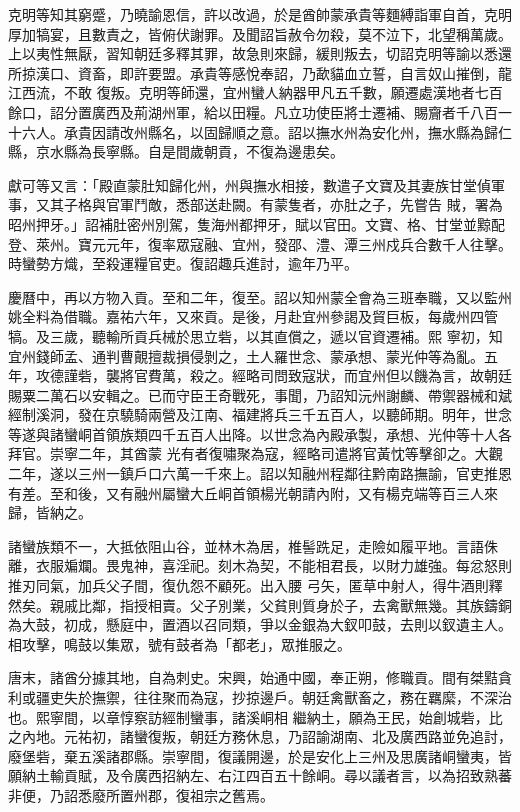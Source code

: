 \begin{pinyinscope}
 克明等知其窮蹙，乃曉諭恩信，許以改過，於是酋帥蒙承貴等麵縛詣軍自首，克明厚加犒宴，且數責之，皆俯伏謝罪。及聞詔旨赦令勿殺，莫不泣下，北望稱萬歲。上以夷性無厭，習知朝廷多釋其罪，故急則來歸，緩則叛去，切詔克明等諭以悉還所掠漢口、資畜，即許要盟。承貴等感悅奉詔，乃歃貓血立誓，自言奴山摧倒，龍江西流，不敢
 復叛。克明等師還，宜州蠻人納器甲凡五千數，願遷處漢地者七百餘口，詔分置廣西及荊湖州軍，給以田糧。凡立功使臣將士遷補、賜齎者千八百一十六人。承貴因請改州縣名，以固歸順之意。詔以撫水州為安化州，撫水縣為歸仁縣，京水縣為長寧縣。自是間歲朝貢，不復為邊患矣。



 獻可等又言：「殿直蒙肚知歸化州，州與撫水相接，數遣子文寶及其妻族甘堂偵軍事，又其子格與官軍鬥敵，悉部送赴闕。有蒙隻者，亦肚之子，先嘗告
 賊，署為昭州押牙。」詔補肚密州別駕，隻海州都押牙，賦以官田。文寶、格、甘堂並黥配登、萊州。寶元元年，復率眾寇融、宜州，發邵、澧、潭三州戍兵合數千人往擊。時蠻勢方熾，至殺運糧官吏。復詔趣兵進討，逾年乃平。



 慶曆中，再以方物入貢。至和二年，復至。詔以知州蒙全會為三班奉職，又以監州姚全料為借職。嘉祐六年，又來貢。是後，月赴宜州參謁及貿巨板，每歲州四管犒。及三歲，聽輸所貢兵械於思立砦，以其直償之，遞以官資遷補。熙
 寧初，知宜州錢師孟、通判曹覿擅裁損侵剝之，土人羅世念、蒙承想、蒙光仲等為亂。五年，攻德謹砦，襲將官費萬，殺之。經略司問致寇狀，而宜州但以饑為言，故朝廷賜粟二萬石以安輯之。已而守臣王奇戰死，事聞，乃詔知沅州謝麟、帶禦器械和斌經制溪洞，發在京驍騎兩營及江南、福建將兵三千五百人，以聽師期。明年，世念等遂與諸蠻峒首領族類四千五百人出降。以世念為內殿承製，承想、光仲等十人各拜官。崇寧二年，其酋蒙
 光有者復嘯聚為寇，經略司遣將官黃忱等擊卻之。大觀二年，遂以三州一鎮戶口六萬一千來上。詔以知融州程鄰往黔南路撫諭，官吏推恩有差。至和後，又有融州屬蠻大丘峒首領楊光朝請內附，又有楊克端等百三人來歸，皆納之。



 諸蠻族類不一，大抵依阻山谷，並林木為居，椎髻跣足，走險如履平地。言語侏離，衣服斒斕。畏鬼神，喜淫祀。刻木為契，不能相君長，以財力雄強。每忿怒則推刃同氣，加兵父子間，復仇怨不顧死。出入腰
 弓矢，匿草中射人，得牛酒則釋然矣。親戚比鄰，指授相賣。父子別業，父貧則質身於子，去禽獸無幾。其族鑄銅為大鼓，初成，懸庭中，置酒以召同類，爭以金銀為大釵叩鼓，去則以釵遺主人。相攻擊，鳴鼓以集眾，號有鼓者為「都老」，眾推服之。



 唐末，諸酋分據其地，自為刺史。宋興，始通中國，奉正朔，修職貢。間有桀黠貪利或疆吏失於撫禦，往往聚而為寇，抄掠邊戶。朝廷禽獸畜之，務在羈縻，不深治也。熙寧間，以章惇察訪經制蠻事，諸溪峒相
 繼納土，願為王民，始創城砦，比之內地。元祐初，諸蠻復叛，朝廷方務休息，乃詔諭湖南、北及廣西路並免追討，廢堡砦，棄五溪諸郡縣。崇寧間，復議開邊，於是安化上三州及思廣諸峒蠻夷，皆願納土輸貢賦，及令廣西招納左、右江四百五十餘峒。尋以議者言，以為招致熟蕃非便，乃詔悉廢所置州郡，復祖宗之舊焉。




\end{pinyinscope}

